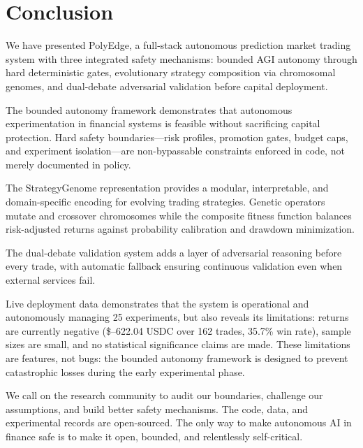 \documentclass[11pt]{article}
\begin{document}
\section{Conclusion}\label{sec:conclusion}

We have presented PolyEdge, a full-stack autonomous prediction market trading system with three integrated safety mechanisms: bounded AGI autonomy through hard deterministic gates, evolutionary strategy composition via chromosomal genomes, and dual-debate adversarial validation before capital deployment.

The bounded autonomy framework demonstrates that autonomous experimentation in financial systems is feasible without sacrificing capital protection. Hard safety boundaries---risk profiles, promotion gates, budget caps, and experiment isolation---are non-bypassable constraints enforced in code, not merely documented in policy.

The StrategyGenome representation provides a modular, interpretable, and domain-specific encoding for evolving trading strategies. Genetic operators mutate and crossover chromosomes while the composite fitness function balances risk-adjusted returns against probability calibration and drawdown minimization.

The dual-debate validation system adds a layer of adversarial reasoning before every trade, with automatic fallback ensuring continuous validation even when external services fail.

Live deployment data demonstrates that the system is operational and autonomously managing 25 experiments, but also reveals its limitations: returns are currently negative (\$--622.04 USDC over 162 trades, 35.7\% win rate), sample sizes are small, and no statistical significance claims are made. These limitations are features, not bugs: the bounded autonomy framework is designed to prevent catastrophic losses during the early experimental phase.

We call on the research community to audit our boundaries, challenge our assumptions, and build better safety mechanisms. The code, data, and experimental records are open-sourced. The only way to make autonomous AI in finance safe is to make it open, bounded, and relentlessly self-critical.




\appendix

\end{document}
